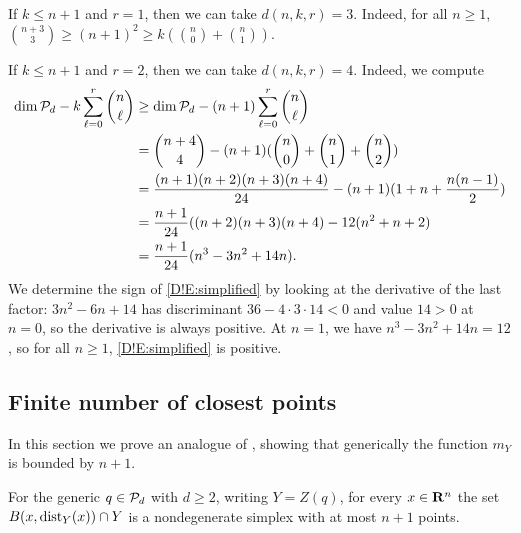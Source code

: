 \begin{example}
\label{D!Ex:poly-degree}
  If $k \leq n + 1$ and $r = 1$, then we can take $d(n, k, r) = 3$. Indeed, for all $n \geq 1$, $\binom{n + 3}{3} \geq (n + 1)^2 \geq k (\binom{n}{0} + \binom{n}{1})$.

  If $k \leq n + 1$ and $r = 2$, then we can take $d(n, k, r) = 4$. Indeed, we compute
  \begin{align}
    \dim \mathcal{P}_d - k \sum_{\ell = 0}^r \binom{n}{\ell} & \geq \dim \mathcal{P}_d - (n + 1) \sum_{\ell = 0}^r \binom{n}{\ell} \nonumber \\
    & = \binom{n + 4}{4} - (n + 1)(\binom{n}{0} + \binom{n}{1} + \binom{n}{2}) \nonumber \\
    &= \frac{(n + 1)(n + 2)(n + 3)(n + 4)}{24} - (n + 1)(1 + n + \frac{n (n - 1)}{2}) \nonumber \\
    & = \frac{n + 1}{24} ((n + 2)(n + 3)(n + 4) - 12 (n^2 + n + 2) \nonumber \\
    & = \frac{n + 1}{24} (n^3 - 3n^2 + 14n). \label{D!E:simplified}
  \end{align}
  We determine the sign of \eqref{D!E:simplified} by looking at the derivative of the last factor: $3n^2 - 6n + 14$ has discriminant $36 - 4 \cdot 3 \cdot 14 < 0$ and value $14 > 0$ at $n = 0$, so the derivative is always positive. At $n = 1$, we have $n^3 - 3n^2 + 14n = 12$, so for all $n \geq 1$, \eqref{D!E:simplified} is positive.
\end{example}

\subsection{Finite number of closest points}In this section we prove an analogue of \cite[Proposition 3]{Yomdin1981}, showing that generically the function $m_Y$ is bounded by $n+1$. 

\begin{theorem}
\label{D!T:Yomdin}
  For the generic $q \in \mathcal{P}_d$ with $d\geq 2$, writing $Y = Z(q)$,  for every $x\in\mathbf{R}^n$ the set $B(x, \operatorname{dist}_Y(x)) \cap Y$ is a nondegenerate simplex with at most $n + 1$ points.
\end{theorem}

